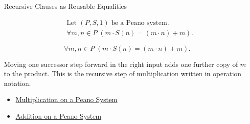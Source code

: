 \begin{topicbox}{Recursive Clauses as Reusable Equalities}
\begin{remark*}
\[
\begin{aligned}
&\text{Let } (P,S,1) \text{ be a Peano system.}\\
&\forall m,n \in P\;(m \cdot S(n) = (m \cdot n) + m).
\end{aligned}
\]
\end{remark*}

\begin{remark*}
\[
\forall m,n \in P\;(m \cdot S(n) = (m \cdot n) + m).
\]
\end{remark*}

\begin{remark*}[Interpretation]
Moving one successor step forward in the right input adds one further copy of
$m$ to the product. This is the recursive step of multiplication written in
operation notation.
\end{remark*}

\begin{dependencies}
\begin{itemize}
  \item \hyperref[def:multiplication-on-peano-system]{Multiplication on a Peano System}
  \item \hyperref[def:addition-on-peano-system]{Addition on a Peano System}
\end{itemize}
\end{dependencies}
\end{topicbox}

